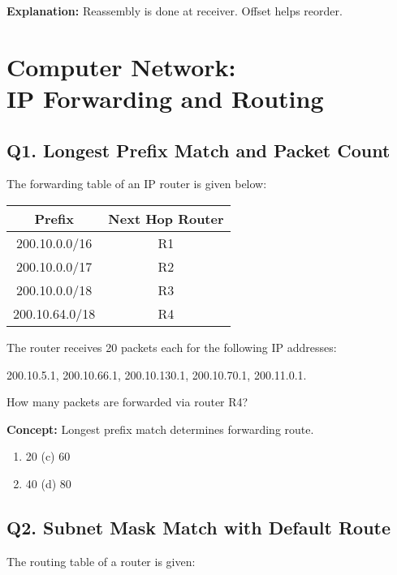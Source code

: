 \textbf{Explanation:} Reassembly is done at receiver. Offset helps reorder.

\section[Computer Network: IP Forwarding and Routing]
{Computer Network:\\ IP Forwarding and Routing}

\subsection*{Q1. Longest Prefix Match and Packet Count}
The forwarding table of an IP router is given below:

\begin{table}[H]
\centering
\renewcommand{\arraystretch}{1.2}
\begin{tabular}{|c|c|}
\hline
\textbf{Prefix} & \textbf{Next Hop Router} \\
\hline
200.10.0.0/16 & R1 \\
200.10.0.0/17 & R2 \\
200.10.0.0/18 & R3 \\
200.10.64.0/18 & R4 \\
\hline
\end{tabular}
\end{table}

The router receives 20 packets each for the following IP addresses:

200.10.5.1, 200.10.66.1, 200.10.130.1, 200.10.70.1, 200.11.0.1.

How many packets are forwarded via router R4? 

\textbf{Concept:} Longest prefix match determines forwarding route.

\begin{enumerate}[label=(\alph*)]
    \item 20 \hspace{5cm} (c) 60
    \item 40 \hspace{5cm} (d) 80
\end{enumerate}


\subsection*{Q2. Subnet Mask Match with Default Route}
The routing table of a router is given:

